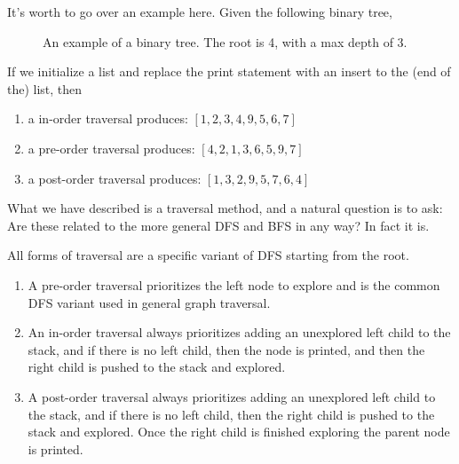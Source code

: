   \begin{example}
    It's worth to go over an example here. Given the following binary tree, 

    \begin{figure}[H]
      \centering 
      \caption{An example of a binary tree. The root is 4, with a max depth of 3. } 
      \label{fig:binary_tree_to_list}
    \end{figure}
    If we initialize a list and replace the print statement with an insert to the (end of the) list, then 
    \begin{enumerate}
      \item a in-order traversal produces: $[1, 2, 3, 4, 9, 5, 6, 7]$
      \item a pre-order traversal produces: $[4, 2, 1, 3, 6, 5, 9, 7]$
      \item a post-order traversal produces: $[1, 3, 2, 9, 5, 7, 6, 4]$
    \end{enumerate}
  \end{example}

  What we have described is a traversal method, and a natural question is to ask: Are these related to the more general DFS and BFS in any way? In fact it is. 

  \begin{theorem}
    All forms of traversal are a specific variant of DFS starting from the root. 
    \begin{enumerate}
      \item A pre-order traversal prioritizes the left node to explore and is the common DFS variant used in general graph traversal.  
      \item An in-order traversal always prioritizes adding an unexplored left child to the stack, and if there is no left child, then the node is printed, and then the right child is pushed to the stack and explored. 
      \item A post-order traversal always prioritizes adding an unexplored left child to the stack, and if there is no left child, then the right child is pushed to the stack and explored. Once the right child is finished exploring the parent node is printed. 
    \end{enumerate}
  \end{theorem}

